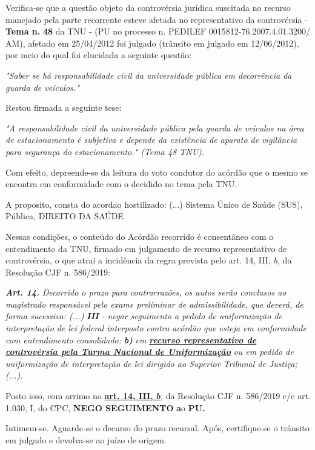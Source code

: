 \documentclass[12pt]{article}
\begin{document}
\justifying
\noindent Verifica-se que a questão objeto da controvérsia jurídica suscitada no recurso manejado pela parte recorrente esteve afetada no representativo da controvérsia - \textbf{Tema n. }\textbf{48} da TNU - (PU no processo n. PEDILEF 0015812-76.2007.4.01.3200/ AM),  afetado em 25/04/2012 foi julgado (trânsito em julgado em 12/06/2012), por meio do qual foi elucidada a seguinte questão:

\noindent \textit{"Saber se há responsabilidade civil da universidade pública em decorrência da guarda de veículos."}

\noindent Restou firmada a seguinte tese:

\noindent \textit{"A responsabilidade civil da universidade pública pela guarda de veículos na área de estacionamento é subjetiva e depende da existência de aparato de vigilância para segurança do estacionamento." (Tema 48 TNU).}

\noindent Com efeito, depreende-se da leitura do voto condutor do acórdão que o mesmo se encontra em conformidade com o decidido no  tema pela TNU.

\noindent A proposito, consta do acordao hostilizado: (...) Sistema Único de Saúde (SUS), Pública, DIREITO DA SAÚDE

\noindent Nessas condições, o conteúdo do Acórdão recorrido é consentâneo com o entendimento da TNU, firmado em julgamento de recurso representativo de controvérsia, o que atrai a incidência da regra prevista pelo art. 14, III, \textit{b,} da Resolução CJF n. 586/2019:

\noindent \textit{\textbf{Art. 14.}}\textit{ Decorrido o prazo para contrarrazões, os autos serão conclusos ao magistrado responsável pelo exame preliminar de admissibilidade, que deverá, de forma sucessiva: (...) }\textit{\textbf{III }}\textit{- negar seguimento a pedido de uniformização de interpretação de lei federal interposto contra acórdão que esteja em conformidade com entendimento consolidado: }\textit{\textbf{b)}}\textit{ em }\uline{\textit{\textbf{recurso representativo de controvérsia pela Turma Nacional de Uniformização}}}\textit{ ou em pedido de uniformização de interpretação de lei dirigido ao Superior Tribunal de Justiça;(...).}

\noindent Posto isso, com arrimo no \uline{\textbf{art. 14, III, }}\uline{\textit{\textbf{b}}}\textit{,} da Resolução CJF n. 586/2019 c/c art. 1.030, I, do CPC, \textbf{NEGO SEGUIMENTO }\textbf{a}o\textbf{ PU}\textbf{.}

\noindent Intimem-se. Aguarde-se o decurso do prazo recursal. Após, certifique-se o trânsito em julgado e devolva-se ao juízo de origem.
\end{document}
